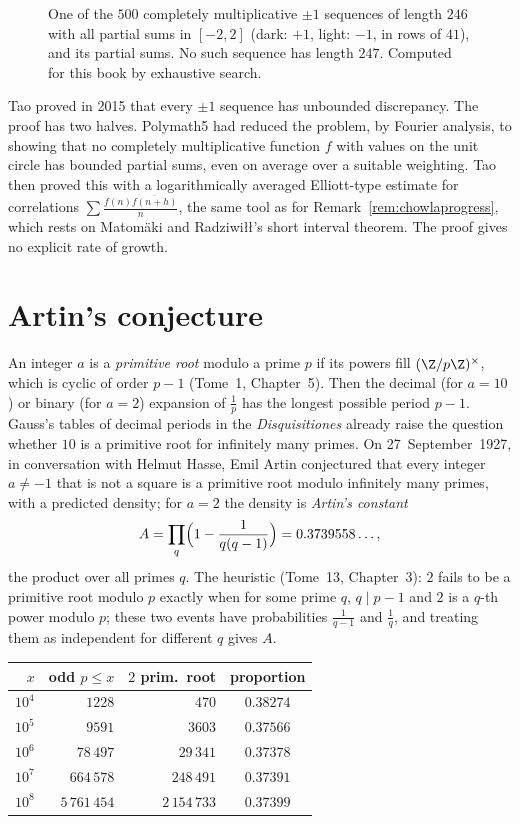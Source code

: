 \begin{figure}[ht]
\centering
{}
\caption{One of the $500$ completely multiplicative $\pm1$ sequences of length $246$ with all partial sums in $[-2,2]$ (dark: $+1$, light: $-1$, in rows of
$41$), and its partial sums. No such sequence has length $247$. Computed for this book by exhaustive search.}
\label{fig:mult}
\end{figure}

\begin{remark}\label{rem:taoedp}
Tao proved in 2015 that every $\pm1$ sequence has unbounded discrepancy. The proof has two halves. Polymath5 had reduced the problem, by Fourier analysis, to
showing that no completely multiplicative function $f$ with values on the unit circle has bounded partial sums, even on average over a suitable weighting.
Tao then proved this with a logarithmically averaged Elliott-type estimate for correlations $\sum\frac{f(n)\overline{f(n+h)}}n$, the same tool as for
Remark~\ref{rem:chowlaprogress}, which rests on Matom\"aki and Radziwi\l\l's short interval theorem. The proof gives no explicit rate of growth.
\end{remark}

\section{Artin's conjecture}

An integer $a$ is a \emph{primitive root} modulo a prime $p$ if its powers fill $(\Z/p\Z)^\times$, which is cyclic of order $p-1$ (Tome~1, Chapter~5). Then the
decimal (for $a=10$) or binary (for $a=2$) expansion of $\frac1p$ has the longest possible period $p-1$. Gauss's tables of decimal periods in the
\emph{Disquisitiones} already raise the question whether $10$ is a primitive root for infinitely many primes. On 27~September~1927, in conversation with Helmut Hasse, Emil Artin conjectured that every integer $a\ne-1$ that is
not a square is a primitive root modulo infinitely many primes, with a predicted density; for $a=2$ the density is \emph{Artin's constant}
\[
A=\prod_q\Bigl(1-\frac1{q(q-1)}\Bigr)=0.3739558\ldots,
\]
the product over all primes $q$. The heuristic (Tome~13, Chapter~3): $2$ fails to be a primitive root modulo $p$ exactly when for some prime $q$, $q\mid p-1$ and $2$
is a $q$-th power modulo $p$; these two events have probabilities $\frac1{q-1}$ and $\frac1q$, and treating them as independent for different $q$ gives $A$.

\begin{center}\small
\begin{tabular}{rrrc}
$x$&odd $p\le x$&$2$ prim.\ root&proportion\\\hline
$10^4$&$1228$&$470$&$0.38274$\\
$10^5$&$9591$&$3603$&$0.37566$\\
$10^6$&$78\,497$&$29\,341$&$0.37378$\\
$10^7$&$664\,578$&$248\,491$&$0.37391$\\
$10^8$&$5\,761\,454$&$2\,154\,733$&$0.37399$
\end{tabular}
\end{center}

